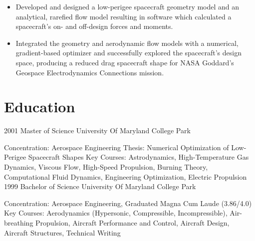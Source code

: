 \documentclass[
  letterpaper,
  DIV=11,
  numbers=noendperiod]{scrartcl}
\providecommand{\tightlist}{%
  \setlength{\itemsep}{0pt}\setlength{\parskip}{0pt}}\usepackage{longtable,booktabs,array}
\begin{document}
\begin{itemize}
\tightlist
\item
  Developed and designed a low-perigee spacecraft geometry model and an
  analytical, rarefied flow model resulting in software which calculated
  a spacecraft's on- and off-design forces and moments.
\item
  Integrated the geometry and aerodynamic flow models with a numerical,
  gradient-based optimizer and successfully explored the spacecraft's
  design space, producing a reduced drag spacecraft shape for NASA
  Goddard's Geospace Electrodynamics Connections mission.
\end{itemize}

\section{Education}\label{education}

2001 \textbar{} Master of Science \textbar{} University Of Maryland
College Park

Concentration: Aerospace Engineering Thesis: Numerical Optimization of
Low-Perigee Spacecraft Shapes Key Courses: Astrodynamics,
High-Temperature Gas Dynamics, Viscous Flow, High-Speed Propulsion,
Burning Theory, Computational Fluid Dynamics, Engineering Optimization,
Electric Propulsion 1999 \textbar{} Bachelor of Science \textbar{}
University Of Maryland College Park

Concentration: Aerospace Engineering, Graduated Magna Cum Laude
(3.86/4.0) Key Courses: Aerodynamics (Hypersonic, Compressible,
Incompressible), Air-breathing Propulsion, Aircraft Performance and
Control, Aircraft Design, Aircraft Structures, Technical Writing
\end{document}
